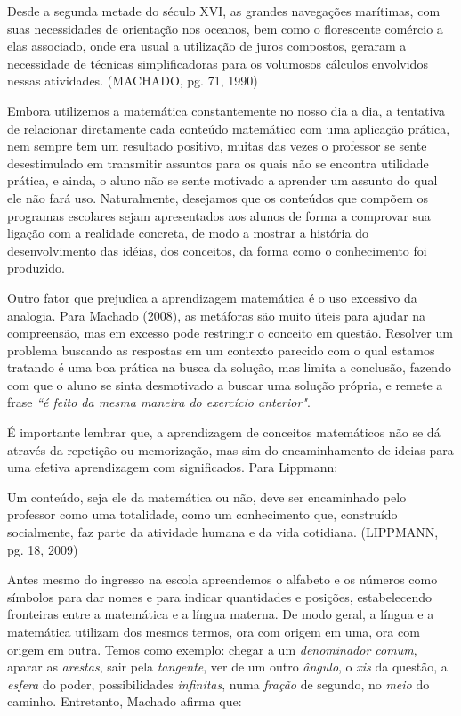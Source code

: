 \documentclass[brasil]{abnt}
\begin{document}
    \begin{citacao} Desde a segunda metade do século XVI, as grandes navegações marítimas, com suas necessidades de orientação nos oceanos, bem como o florescente comércio a 
					elas associado, onde era usual a utilização de juros compostos, geraram a necessidade de técnicas simplificadoras para os volumosos cálculos envolvidos nessas 
					atividades. (MACHADO, pg. 71, 1990)
    \end{citacao}
    
    Embora utilizemos a matemática constantemente no nosso dia a dia, a tentativa de relacionar diretamente cada conteúdo matemático com uma aplicação prática, 
    nem sempre tem um resultado positivo, muitas das vezes o professor se sente desestimulado em transmitir assuntos para os quais não se encontra utilidade prática, 
    e ainda, o aluno não se sente motivado a aprender um assunto do qual ele não fará uso. Naturalmente, desejamos que os conteúdos que compõem os programas escolares sejam apresentados 
    aos alunos de forma a comprovar sua ligação com a realidade concreta, de  modo a mostrar a história do desenvolvimento das idéias, dos conceitos, da forma como o conhecimento foi produzido.
    
    Outro fator que prejudica a aprendizagem matemática é o uso excessivo da analogia. Para Machado (2008), as metáforas são muito úteis para ajudar na compreensão, mas em excesso pode restringir o
    conceito em questão. Resolver um problema buscando as respostas em um contexto parecido com o qual estamos tratando é uma boa prática na busca da solução, mas limita a conclusão, fazendo com que o
    aluno se sinta desmotivado a buscar uma solução própria, e remete a frase \textit{“é feito da mesma maneira do exercício anterior"}.   
    
    É importante lembrar que, a aprendizagem de conceitos matemáticos não se dá através da repetição ou memorização, mas sim do encaminhamento de ideias para uma efetiva aprendizagem com significados. 
    Para Lippmann:
    \begin{citacao} Um conteúdo, seja ele da matemática ou não, deve ser encaminhado pelo professor como uma totalidade, como um conhecimento que, construído socialmente, faz parte da atividade humana e
					da vida cotidiana. (LIPPMANN, pg. 18, 2009)
    \end{citacao} 
    
	Antes mesmo do ingresso na escola apreendemos o alfabeto e os números como símbolos para dar nomes e para indicar quantidades 
	e posições, estabelecendo fronteiras entre a matemática e a língua materna. De modo geral, a língua e a matemática utilizam dos mesmos termos, 
	ora com origem em uma, ora com origem em outra. Temos como exemplo: chegar a um \textit{denominador comum}, aparar as \textit{arestas}, sair pela \textit{tangente}, 
	ver de um outro \textit{ângulo}, o \textit{xis} da questão, a \textit{esfera} do poder, possibilidades \textit{infinitas}, numa \textit{fração} de segundo, no \textit{meio} do caminho.
	Entretanto, Machado afirma que:
	 
\end{document}
